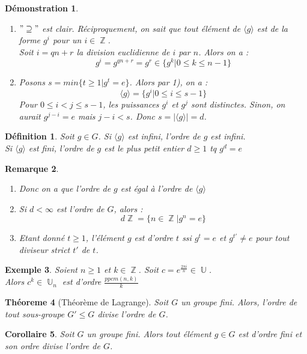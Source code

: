\documentclass[a4paper, oneside]{report}
\theoremstyle{break}
\newtheorem{thm}{Théoreme}[section] %
\newtheorem{defi}[thm]{Définition}
\newtheorem{cor}[thm]{Corollaire}
\newtheorem{exem}[thm]{Exemple}
\newtheorem{remar}[thm]{Remarque}
\newtheorem*{demo}{Démonstration}
\DeclareMathOperator{\Z}{\mathbb{Z}}
\DeclareMathOperator{\U}{\mathbb{U}}
\begin{document}
\begin{demo}
	\begin{enumerate}
		\item $"\supseteq"$ est clair. Réciproquement, on sait que tout élément de $\langle g\rangle$ est de la forme $g^i$ pour un $i \in \Z$.\\
		Soit $i=qn+r$ la division euclidienne de $i$ par $n$. Alors on a :
		$$g^i=g^{qn+r}=g^r \in \{g^k | 0\leq k \leq n-1 \}$$
		
		\item Posons $s=min\{t \geq 1 | g^t=e \}$. Alors par 1), on a :
		$$\langle g\rangle = \{g^i | 0\leq i \leq s-1 \}$$
		Pour $0\leq i < j \leq s-1$, les puissances $g^i$ et $g^j$ sont distinctes. Sinon, on aurait $g^{j-i}=e$ mais $j-i<s$. Donc $s=|\langle g\rangle| = d$.
	\end{enumerate}	
\end{demo}

\begin{defi}
	Soit $g\in G$. Si $\langle g\rangle$ est infini, l'ordre de $g$ est infini.\\
	Si $\langle g\rangle$ est fini, l'ordre de $g$ est le plus petit entier $d\geq 1$ tq $g^d=e$	
\end{defi}

\begin{remar}
	\begin{enumerate}
		\item Donc on a que l'ordre de $g$ est égal à l'ordre de $\langle g\rangle$
		\item Si $d<\infty$ est l'ordre de $G$, alors :
		$$d\Z=\{n\in \Z | g^n =e \}$$
		\item Etant donné $t\geq 1$, l'élément $g$ est d'ordre $t$ ssi $g^t=e$ et $g^{t'}\neq e$ pour tout diviseur strict $t'$ de $t$.
	\end{enumerate}	
\end{remar}

\begin{exem}
	Soient $n\geq 1$ et $k\in \Z$. Soit $c=e^{\frac{2\pi i}{n}}\in \U$.\\
	Alors $c^k\in \U_n$ est d'ordre $\frac{ppcm(n,k)}{k}$	
\end{exem}

\begin{thm}[Théorème de Lagrange]
	Soit $G$ un groupe fini. Alors, l'ordre de tout sous-groupe $G'\leq G$ divise l'ordre de $G$.
\end{thm}

\begin{cor}
	Soit $G$ un groupe fini. Alors tout élément $g\in G$ est d'ordre fini et son ordre divise l'ordre de $G$.
\end{cor}
\end{document}
